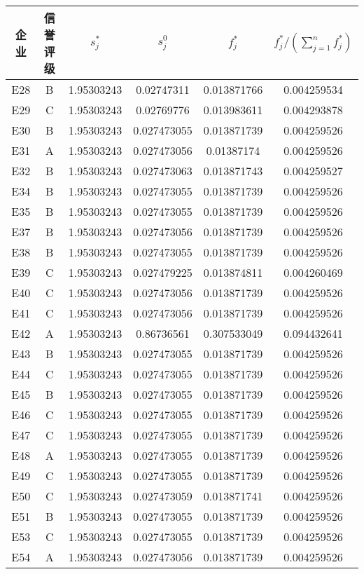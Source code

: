 \documentclass{cumcmthesis}
\begin{document}
\begin{appendices}
\begin{table}[H]   %
	\centering
	\begin{tabular}{cccccc}
		\toprule[1.5pt]
		企业& 信誉评级 & $s_j^*$ & $s_j^0$ & $f_j^*$ & $f_j^*/(\sum_{j=1}^n f_j^*)$ \\ 
		\midrule[1pt]
E28 & B & 1.95303243 & 0.02747311 & 0.013871766 & 0.004259534 \\ 
E29 & C & 1.95303243 & 0.02769776 & 0.013983611 & 0.004293878 \\ 
E30 & B & 1.95303243 & 0.027473055 & 0.013871739 & 0.004259526 \\ 
E31 & A & 1.95303243 & 0.027473056 & 0.01387174 & 0.004259526 \\ 
E32 & B & 1.95303243 & 0.027473063 & 0.013871743 & 0.004259527 \\ 
E34 & B & 1.95303243 & 0.027473055 & 0.013871739 & 0.004259526 \\ 
E35 & B & 1.95303243 & 0.027473055 & 0.013871739 & 0.004259526 \\ 
E37 & B & 1.95303243 & 0.027473056 & 0.013871739 & 0.004259526 \\ 
E38 & B & 1.95303243 & 0.027473055 & 0.013871739 & 0.004259526 \\ 
E39 & C & 1.95303243 & 0.027479225 & 0.013874811 & 0.004260469 \\ 
E40 & C & 1.95303243 & 0.027473056 & 0.013871739 & 0.004259526 \\ 
E41 & C & 1.95303243 & 0.027473056 & 0.013871739 & 0.004259526 \\ 
E42 & A & 1.95303243 & 0.86736561 & 0.307533049 & 0.094432641 \\ 
E43 & B & 1.95303243 & 0.027473055 & 0.013871739 & 0.004259526 \\ 
E44 & C & 1.95303243 & 0.027473055 & 0.013871739 & 0.004259526 \\ 
E45 & B & 1.95303243 & 0.027473055 & 0.013871739 & 0.004259526 \\ 
E46 & C & 1.95303243 & 0.027473055 & 0.013871739 & 0.004259526 \\ 
E47 & C & 1.95303243 & 0.027473055 & 0.013871739 & 0.004259526 \\ 
E48 & A & 1.95303243 & 0.027473055 & 0.013871739 & 0.004259526 \\ 
E49 & C & 1.95303243 & 0.027473055 & 0.013871739 & 0.004259526 \\ 
E50 & C & 1.95303243 & 0.027473059 & 0.013871741 & 0.004259526 \\ 
E51 & B & 1.95303243 & 0.027473055 & 0.013871739 & 0.004259526 \\ 
E53 & C & 1.95303243 & 0.027473055 & 0.013871739 & 0.004259526 \\ 
E54 & A & 1.95303243 & 0.027473056 & 0.013871739 & 0.004259526 \\ 
		\bottomrule[1.5pt]
\end{tabular}
\end{table}


\end{appendices}
\end{document}
